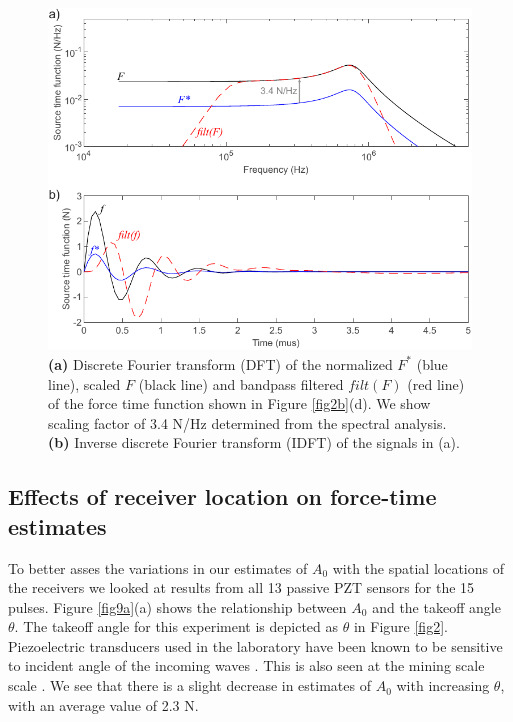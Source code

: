 \documentclass[preprint,3p, 11pt,authoryear]{elsarticle}
\begin{document}
\begin{figure}[ht]
     	\centering
\includegraphics[scale=0.9]{FIG9.pdf} 
\caption{\textbf{(a)} Discrete Fourier transform (DFT) of the normalized $F^{*}$ (blue line), scaled $F$ (black line) and bandpass filtered $filt(F)$ (red line) of the force time function shown in Figure \ref{fig2b}(d). We show scaling factor of 3.4 N/Hz determined from the spectral analysis. \textbf{(b)} Inverse discrete Fourier transform (IDFT) of the signals in (a). }
	\label{fig9} 
\end{figure}
\subsection{Effects of receiver location on force-time estimates}
\label{All_sensors}

To better asses the variations in our estimates of $A_{0}$ with the spatial locations of the receivers we looked at results from all 13 passive PZT sensors for the 15 pulses. Figure \ref{fig9a}(a) shows the relationship between $A_{0}$ and the takeoff angle $\theta$. The takeoff angle for this experiment is depicted as $\theta$ in Figure \ref{fig2}.  Piezoelectric transducers used in the laboratory have been known to be sensitive to incident angle of the incoming waves \citep{Goodfellow2015}.  This is also seen at the mining scale scale \citep{Kwaitek2011}. We see that there is a slight decrease in estimates of $A_{0}$ with increasing  $\theta$, with an average value of 2.3 N.  
\end{document}
